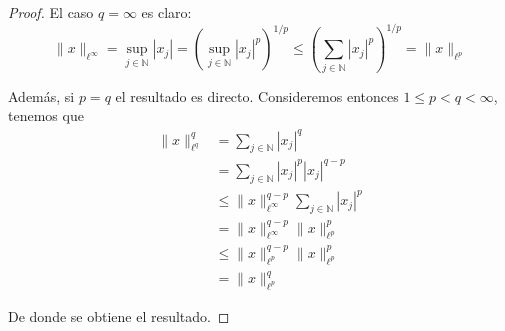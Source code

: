 \documentclass{article}
\begin{document}
\begin{proof} El caso $q = \infty$ es claro:
	$$\|x\|_{\ell^{\infty}} 
		= 	\sup_{j \in \mathbb{N}} |x_{j}|
		= 	\left(\sup_{j \in \mathbb{N}} |x_{j}|^{p}\right)^{1/p} 
		\leq	\left(\sum_{j \in \mathbb{N}} |x_{j}|^{p}\right)^{1/p} = \|x\|_{\ell^{p}}
	$$

Además, si $p = q$ el resultado es directo. Consideremos entonces $1 \leq p < q < \infty$, tenemos que
	\begin{align*}
		\|x\|_{\ell^{q}}^{q}
			&=		\sum_{j \in \mathbb{N}} |x_{j}|^{q}	\\
			&=		\sum_{j \in \mathbb{N}} |x_{j}|^{p} |x_{j}|^{q-p}	\\
			&\leq		\|x\|^{q-p}_{\ell^{\infty}} \sum_{j \in \mathbb{N}} |x_{j}|^{p}	\\
			&=		\|x\|^{q-p}_{\ell^{\infty}} \|x\|_{\ell^{p}}^{p}	\\
			&\leq		\|x\|^{q-p}_{\ell^{p}} \|x\|_{\ell^{p}}^{p}	\\
			&=		\|x\|_{\ell^{p}}^{q}		 
	\end{align*}

De donde se obtiene el resultado.
\end{proof}                                          
\end{document}
